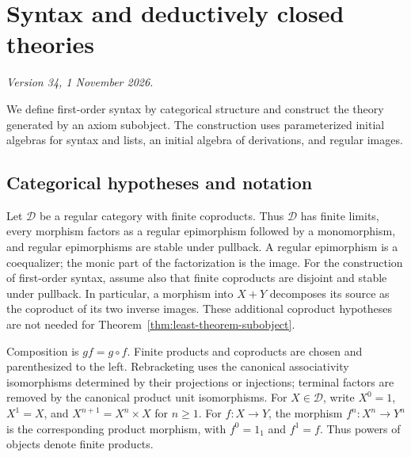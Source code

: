 \documentclass[11pt]{article}
\theoremstyle{definition}\newtheorem{definition}[theorem]{Definition}
\begin{document}
\appendix
\section{Syntax and deductively closed theories}
\label{app:syntax-theories}
\noindent\textit{Version 34, 1 November 2026.}\par\medskip
\label{app:fork-proofs}

We define first-order syntax by categorical structure and construct
the theory generated by an axiom subobject. The construction uses
parameterized initial algebras for syntax and lists, an initial algebra
of derivations, and regular images.

\subsection{Categorical hypotheses and notation}
\label{app:categorical-hypotheses}

Let $\mathcal D$ be a regular category with finite coproducts.
Thus $\mathcal D$ has finite limits, every morphism factors as a
regular epimorphism followed by a monomorphism, and regular
epimorphisms are stable under pullback. A regular epimorphism is a
coequalizer; the monic part of the factorization is the image.
For the construction of first-order syntax, assume also that finite
coproducts are disjoint and stable under pullback. In particular,
a morphism into $X+Y$ decomposes its source as the coproduct of its
two inverse images. These additional coproduct hypotheses are not
needed for Theorem~\ref{thm:least-theorem-subobject}.

Composition is $gf=g\circ f$. Finite products and coproducts are
chosen and parenthesized to the left. Rebracketing uses the canonical
associativity isomorphisms determined by their projections or injections;
terminal factors are removed by the canonical product unit isomorphisms.
For $X\in\mathcal D$, write $X^0=1$, $X^1=X$, and
$X^{n+1}=X^n\times X$ for $n\geq1$.
For $f:X\to Y$, the morphism $f^n:X^n\to Y^n$ is the corresponding
product morphism, with $f^0=1_1$ and $f^1=f$.
Thus powers of objects denote finite products.
\end{document}
